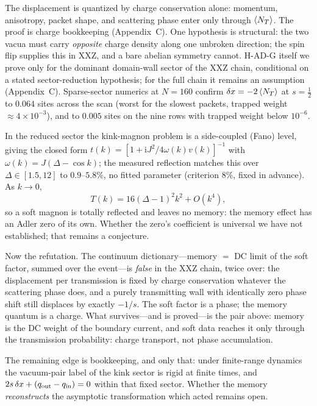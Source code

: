 \documentclass[aps,prl,twocolumn,superscriptaddress,longbibliography,floatfix]{revtex4-2}
\newcommand{\ic}{\ensuremath{\mathrm{i}}}
\begin{document}
The displacement is quantized by charge conservation alone: momentum,
anisotropy, packet shape, and scattering phase enter only through
$\braket{N_T}$. The proof is charge bookkeeping
(Appendix~C). One hypothesis is structural: the two vacua must carry
\emph{opposite} charge density along one unbroken direction; the spin
flip supplies this in XXZ, and a bare abelian symmetry cannot. H-AD-G itself we prove only for the dominant domain-wall sector
of the XXZ chain, conditional on a stated sector-reduction hypothesis;
for the full chain it remains an assumption (Appendix~C).
Sparse-sector numerics at $N=160$ confirm
$\delta x=-2\braket{N_T}$ at $s=\frac12$ to $0.064$ sites across the
scan (worst for the slowest packets, trapped weight
${\approx}4\times10^{-3}$), and to $0.005$ sites on the nine rows with
trapped weight below $10^{-6}$.

In the reduced sector the kink-magnon problem is a side-coupled (Fano)
level, giving the closed form
$t(k)=[1+\ic J^{2}/4\omega(k)v(k)]^{-1}$ with $\omega(k)=J(\Delta-\cos k)$;
the measured reflection matches this over $\Delta\in[1.5,12]$ to
$0.9$--$5.8\%$, no fitted parameter (criterion $8\%$, fixed in advance). As $k\to0$,
\begin{equation}
T(k)=16(\Delta-1)^{2}k^{2}+O(k^{4}),
\label{eq:softzero}
\end{equation}
so a soft magnon is totally reflected and leaves no memory: the memory
effect has an Adler zero of its own. Whether the zero's coefficient is
universal we have not established; that remains a conjecture.

Now the refutation. The continuum dictionary---memory $=$ DC limit of
the soft factor, summed over the event---is \emph{false} in the XXZ
chain, twice over: the displacement per
transmission is fixed by charge conservation whatever the scattering phase
does, and a purely transmitting wall with identically zero phase shift
still displaces by exactly $-1/s$. The soft factor is a
phase; the memory quantum is a charge. What survives---and is proved---is
the pair above: memory is the DC weight of the boundary current, and soft
data reaches it only through the transmission probability: charge
transport, not phase accumulation.

The remaining edge is bookkeeping, and only that: under finite-range
dynamics the vacuum-pair label of the kink sector is
rigid at finite times, and $2s\,\delta x+(q_{\rm out}-q_{\rm in})=0$
within that fixed sector. Whether the memory \emph{reconstructs} the
asymptotic transformation which acted remains open.
\end{document}
